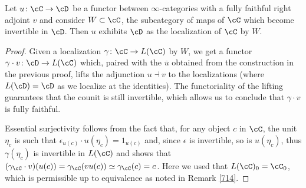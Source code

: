 \begin{prop}

  Let $u\colon\cC\rightarrow\cD$ be a functor between $\infty$-categories with a
  fully faithful right adjoint $v$ and consider $W\subset\cC$, the
  subcategory of maps of $\cC$ which become invertible in $\cD$. Then $u$
  exhibits $\cD$ as the localization of $\cC$ by $W$.
\end{prop}
\begin{proof}
  Given a localization $\gamma\colon\cC\rightarrow L(\cC)$ by $W$, we get a
  functor $\gamma\cdot v\colon\cD\rightarrow L(\cC)$ which, paired with the
  $\overline{u}$ obtained from the construction in the previous proof, lifts the
  adjunction $u\dashv v$ to the localizations (where $L(\cD)=\cD$ as we
  localize at the identities). The functoriality of the lifting guarantees that
  the counit is still invertible, which allows us to conclude that $\gamma\cdot
  v$ is fully faithful.

  \noindent
  Essential surjectivity
  follows from the fact that, for any object $c$ in $\cC$, the unit $\eta_c$ is
  such that $\epsilon_{u(c)}\cdot u(\eta_c)=1_{u(c)}$ and, since $\epsilon$ is
  invertible, so is $u(\eta_c)$, thus $\gamma(\eta_c)$ is invertible in $L(\cC)$
  and shows that
  $(\gamma_{\cC}\cdot v)(u(c))=\gamma_{\cC}(vu(c))\simeq\gamma_\cC(c)=c$.
  Here we used that $L(\cC)_0=\cC_0$, which is permissible up to
  equivalence as noted in Remark \ref{714}.
\end{proof}






